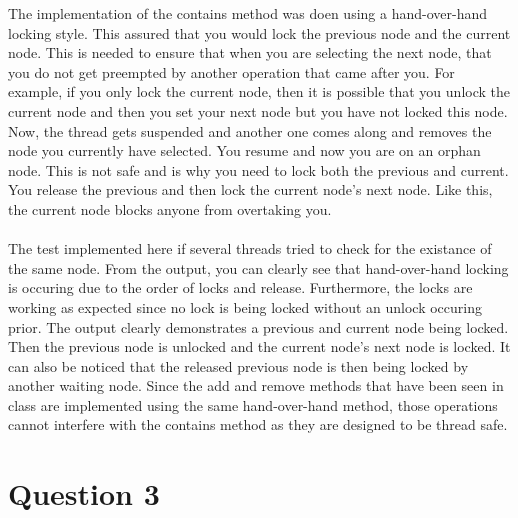 \documentclass[11pt]{article}
\begin{document}
The implementation of the contains method was doen using a hand-over-hand locking style. This assured that you would lock the previous node 
and the current node. This is needed to ensure that when you are selecting the next node, that you do not get preempted by another operation 
that came after you. For example, if you only lock the current node, then it is possible that you unlock the current node and then you set your 
next node but you have not locked this node. Now, the thread gets suspended and another one comes along and removes the node you currently have 
selected. You resume and now you are on an orphan node. This is not safe and is why you need to lock both the previous and current. You release 
the previous and then lock the current node's next node. Like this, the current node blocks anyone from overtaking you.
\\\\
The test implemented here if several threads tried to check for the existance of the same node. From the output, you can clearly see that 
hand-over-hand locking is occuring due to the order of locks and release. Furthermore, the locks are working as expected since no lock 
is being locked without an unlock occuring prior. The output clearly demonstrates a previous and current node being locked. Then the 
previous node is unlocked and the current node's next node is locked. It can also be noticed that the released previous node is then 
being locked by another waiting node. Since the add and remove methods that have been seen in class are implemented using the same 
hand-over-hand method, those operations cannot interfere with the contains method as they are designed to be thread safe.

\section{Question 3}
\end{document}
